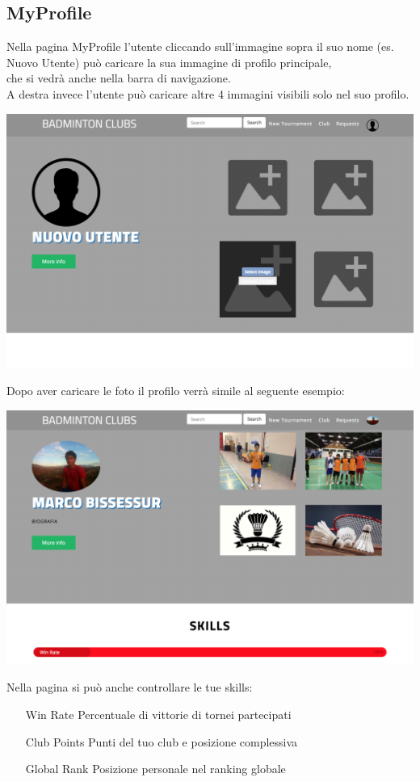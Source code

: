 \documentclass{article}
\begin{document}
\subsection{MyProfile}
Nella pagina MyProfile l'utente cliccando sull'immagine sopra il suo nome (es. Nuovo Utente) può caricare la sua immagine di profilo principale,\\ che si vedrà anche nella barra di navigazione.
\\A destra invece l'utente può caricare altre 4 immagini visibili solo nel suo profilo. 
\begin{center}
    \includegraphics[width=16cm]{UX/mypnuovo}
\end{center}
Dopo aver caricare le foto il profilo verrà simile al seguente esempio:
\begin{center}
    \includegraphics[width=16cm]{UX/myp}
\end{center}
Nella pagina si può anche controllare le tue skills:
\begin{itemize}
    \item [Win Rate] Percentuale di vittorie di tornei partecipati
    \item [Club Points] Punti del tuo club e posizione complessiva 
    \item [Global Rank] Posizione personale nel ranking globale
  \end{itemize}
\end{document}

